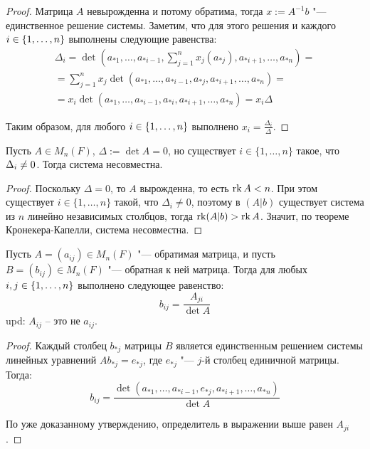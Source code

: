 \begin{proof}
	Матрица $A$ невырожденна и потому обратима, тогда $x := A^{-1}b$ "--- единственное решение системы. Заметим, что для этого решения и каждого $i \in \{1, \dotsc, n\}$ выполнены следующие равенства:
	\begin{multline*}
		\Delta_i = \det\left(a_{*1},\dots,a_{*i-1},\sum_{j = 1}^{n}x_j(a_{*j}),a_{*i+1},\dots,a_{*n}\right) =
		\\
		= \sum_{j = 1}^{n}x_j\det\left(a_{*1},\dots,a_{*i-1},a_{*j},a_{*i+1},\dots,a_{*n}\right)
		=
		\\
		=
		x_i\det\left(a_{*1},\dots,a_{*i-1},a_{*i},a_{*i+1},\dots,a_{*n}\right) = x_i\Delta
	\end{multline*}
	
	Таким образом, для любого $i \in \{1, \dotsc, n\}$ выполнено $x_i = \frac{\Delta_i}{\Delta}$.
\end{proof}

\begin{proposition}
	Пусть $A \in M_n(F)$, $\Delta := \det{A} = 0$, но существует $i \in \{1, \dots, n\}$ такое, что $\Delta_i \hm{\ne} 0$. Тогда система несовместна.
\end{proposition}

\begin{proof}
	Поскольку $\Delta = 0$, то $A$ вырожденна, то есть $\operatorname{rk}{A} < n$. При этом существует $i \in \{1, \dots, n\}$ такой, что $\Delta_i \ne 0$, поэтому в $(A|b)$ существует система из $n$ линейно независимых столбцов, тогда $\operatorname{rk}(A|b) > \operatorname{rk}{A}$. Значит, по теореме Кронекера-Капелли, система несовместна.
\end{proof}

\begin{corollary}
	Пусть $A = (a_{ij}) \in M_n(F)$ "--- обратимая матрица, и пусть $B = (b_{ij}) \in M_n(F)$ "--- обратная к ней матрица. Тогда для любых $i, j \in \{1, \dotsc, n\}$ выполнено следующее равенство:
	\[b_{ij} = \frac{A_{ji}}{\det{A}}\]
    upd: $A_{ij}$ -- это не $a_{ij}$.
\end{corollary}

\begin{proof}
	Каждый столбец $b_{*j}$ матрицы $B$ является единственным решением системы линейных уравнений $Ab_{*j} = e_{*j}$, где $e_{*j}$ "--- $j$-й столбец единичной матрицы. Тогда:
	\[b_{ij} = \frac{\det(a_{*1}, \dots, a_{*i-1},e_{*j},a_{*i+1}, \dots, a_{*n})}{\det{A}}\]
	
	По уже доказанному утверждению, определитель в выражении выше равен $A_{ji}$.
\end{proof}